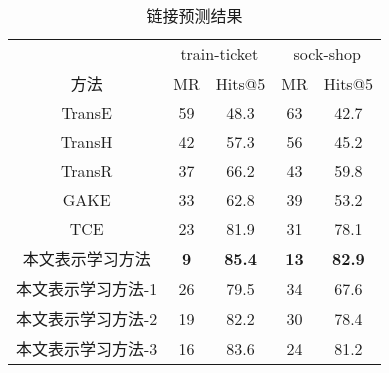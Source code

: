 \begin{table}[htbp]
    \caption{链接预测结果}
    \centering
    \label{link-predict-result}
    \begin{tabular}{ccccc}
    \toprule
           & \multicolumn{2}{c}{train-ticket} & \multicolumn{2}{c}{sock-shop} \\
    方法     & MR            & Hits@5           & MR           & Hits@5         \\ \midrule
    TransE & 59            & 48.3             & 63           & 42.7           \\
    TransH & 42            & 57.3             & 56           & 45.2           \\
    TransR & 37            & 66.2             & 43           & 59.8           \\
    GAKE   & 33            & 62.8             & 39           & 53.2           \\
    TCE    & 23            & 81.9             & 31           & 78.1           \\
    本文表示学习方法   & \textbf{9}    & \textbf{85.4}    & \textbf{13}  & \textbf{82.9}  \\
    本文表示学习方法-1 & 26            & 79.5             & 34           & 67.6         \\ 
    本文表示学习方法-2 & 19           & 82.2             & 30           & 78.4           \\ 
    本文表示学习方法-3 & 16            & 83.6            & 24           & 81.2          \\ 
    \bottomrule
    \end{tabular}
\end{table}

